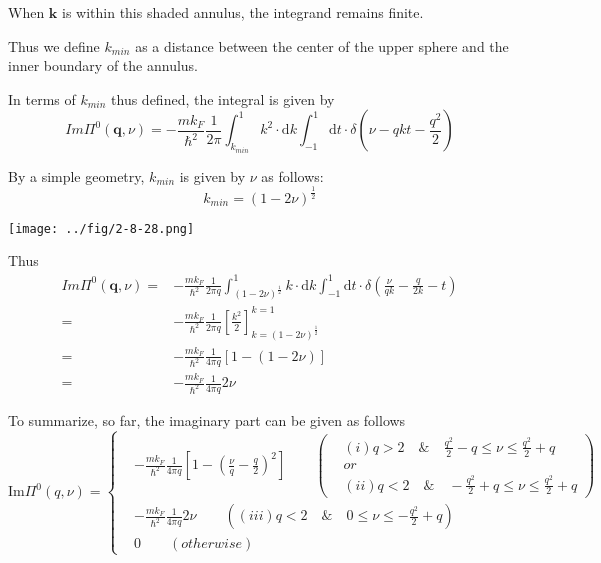 When $\mathbf{k}$ is within this shaded annulus, the integrand remains finite.

Thus we define $k_{min}$ as a distance between the center of the upper sphere and the inner boundary of the annulus.

In terms of $k_{min}$ thus defined, the integral is given by
\[ Im\Pi^0(\mathbf{q},\nu) = - \frac{m k_F}{\hbar^2}\frac{1}{2\pi} \int_{k_{min}}^1 k^2  \cdot \mathrm{d} k \int_{-1}^1 \mathrm{d} t \cdot \delta(\nu-qkt-\frac{q^2}{2})\]

By a simple geometry, $k_{min}$ is given by $\nu$ as follows:
\[ k_{min} = (1-2\nu)^{\frac{1}{2}} \]
\begin{center}\label{Fig2.8.28}
\texttt{[image: ../fig/2-8-28.png]}
\end{center}

Thus
\begin{equation} \label{Eqs2.8.23} \begin{split}
 Im\Pi^0(\mathbf{q},\nu) =& - \frac{m k_F}{\hbar^2}\frac{1}{2\pi q} \int_{(1-2\nu)^{\frac{1}{2}}}^1 k  \cdot \mathrm{d} k \int_{-1}^1 \mathrm{d} t \cdot \delta(\frac{\nu}{qk}-\frac{q}{2 k}-t)\\
=& - \frac{m k_F}{\hbar^2}\frac{1}{2\pi q} \left[ \frac{k^2}{2} \right]_{k=(1-2\nu)^{\frac{1}{2}}}^{k=1}\\
=& - \frac{m k_F}{\hbar^2}\frac{1}{4\pi q} \left[ 1 - (1-2\nu) \right]\\
=& - \frac{m k_F}{\hbar^2}\frac{1}{4\pi q} 2\nu
\end{split}\end{equation}

To summarize, so far, the imaginary part can be given as follows
\begin{equation} \label{Eqs2.8.24}
\text{Im} \Pi^0(q,\nu) = \left\{ \begin{split}
&-\frac{m k_F}{\hbar^2} \frac{1}{4\pi q} \left[ 1-\left( \frac{\nu}{q} - \frac{q}{2} \right)^2 \right] \qquad \left( \begin{split}
&(i) q > 2 \quad\&\quad \frac{q^2}{2} - q\leq \nu \leq \frac{q^2}{2} + q\\
&or\\
&(ii) q < 2 \quad\&\quad -\frac{q^2}{2} + q \leq \nu \leq \frac{q^2}{2} + q
\end{split}  \right)\\
&-\frac{m k_F}{\hbar^2} \frac{1}{4\pi q} 2\nu \qquad 
\left( (iii) q < 2 \quad\&\quad 0 \leq \nu \leq -\frac{q^2}{2}+q \right)\\
&0\qquad  (otherwise)
\end{split} \right.
\end{equation}

